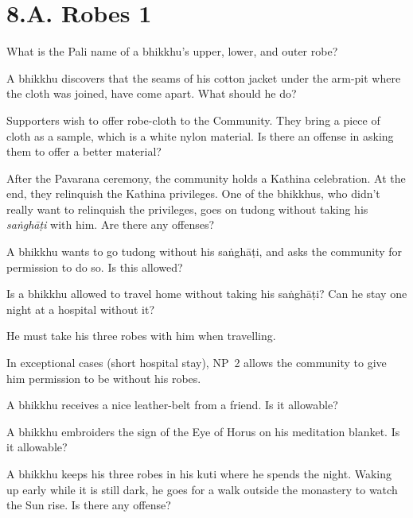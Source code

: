 \chapter{8.A. Robes 1}
\renewcommand*{\theChapterTitle}{8.A. Robes 1}

What is the Pali name of a bhikkhu's upper, lower, and outer robe?

\bigskip

A bhikkhu discovers that the seams of his cotton jacket under the arm-pit where
the cloth was joined, have come apart. What should he do?

\bigskip

Supporters wish to offer robe-cloth to the Community. They bring a piece of cloth as a sample, which
is a white nylon material. Is there an offense in asking them to offer a better
material?

\bigskip

After the Pavarana ceremony, the community holds a Kathina celebration.
At the end, they relinquish the Kathina privileges.
One of the bhikkhus, who didn't really want to relinquish the privileges,
goes on tudong without taking his \emph{saṅghāṭi} with him.
Are there any offenses?

\bigskip

A bhikkhu wants to go tudong without his saṅghāṭi, and asks the community for
permission to do so. Is this allowed?

\bigskip

Is a bhikkhu allowed to travel home without taking his saṅghāṭi? Can he stay one
night at a hospital without it?

\begin{solution}
  He must take his three robes with him when travelling.

  In exceptional cases (short hospital stay), NP~2 allows the community to give
  him permission to be without his robes.
\end{solution}

\bigskip

A bhikkhu receives a nice leather-belt from a friend. Is it allowable?

\bigskip

A bhikkhu embroiders the sign of the Eye of Horus on his meditation blanket. Is it
allowable?

\bigskip

A bhikkhu keeps his three robes in his kuti where he spends the night.
Waking up early while it is still dark, he goes for a walk outside the monastery to watch the Sun rise.
Is there any offense?

